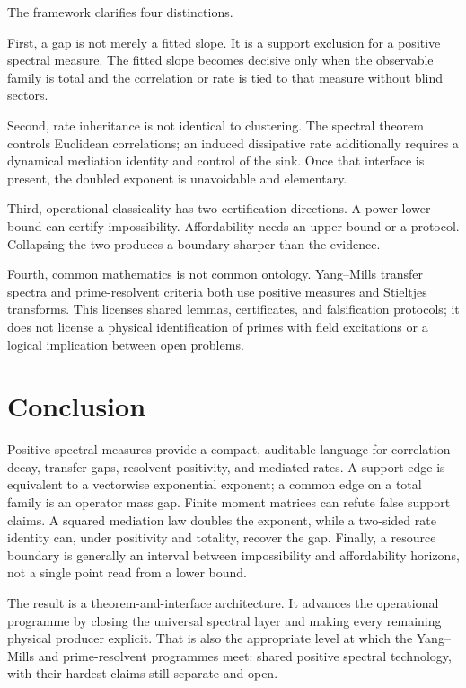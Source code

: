 \documentclass[11pt,a4paper]{article}
\theoremstyle{definition}
\theoremstyle{remark}
\begin{document}
The framework clarifies four distinctions.

First, a gap is not merely a fitted slope.  It is a support exclusion for a
positive spectral measure.  The fitted slope becomes decisive only when the
observable family is total and the correlation or rate is tied to that measure
without blind sectors.

Second, rate inheritance is not identical to clustering.  The spectral theorem
controls Euclidean correlations; an induced dissipative rate additionally
requires a dynamical mediation identity and control of the sink.  Once that
interface is present, the doubled exponent is unavoidable and elementary.

Third, operational classicality has two certification directions.  A power
lower bound can certify impossibility.  Affordability needs an upper bound or a
protocol.  Collapsing the two produces a boundary sharper than the evidence.

Fourth, common mathematics is not common ontology.  Yang--Mills transfer
spectra and prime-resolvent criteria both use positive measures and Stieltjes
transforms.  This licenses shared lemmas, certificates, and falsification
protocols; it does not license a physical identification of primes with field
excitations or a logical implication between open problems.

\section{Conclusion}

Positive spectral measures provide a compact, auditable language for
correlation decay, transfer gaps, resolvent positivity, and mediated rates.  A
support edge is equivalent to a vectorwise exponential exponent; a common edge
on a total family is an operator mass gap.  Finite moment matrices can refute
false support claims.  A squared mediation law doubles the exponent, while a
two-sided rate identity can, under positivity and totality, recover the gap.
Finally, a resource boundary is generally an interval between impossibility
and affordability horizons, not a single point read from a lower bound.

The result is a theorem-and-interface architecture.  It advances the
operational programme by closing the universal spectral layer and making every
remaining physical producer explicit.  That is also the appropriate level at
which the Yang--Mills and prime-resolvent programmes meet: shared positive
spectral technology, with their hardest claims still separate and open.
\end{document}

